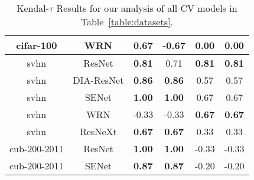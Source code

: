 \begin{table}[t]
\begin{center}
\begin{tabular}{|c|c|c|c|c|c|}
cifar-100 & WRN  & \textbf{0.67} & -0.67 & 0.00 & 0.00 \\
\hline
svhn & ResNet  & \textbf{0.81} & 0.71 & \textbf{0.81} & \textbf{0.81} \\
svhn & DIA-ResNet  & \textbf{0.86} & \textbf{0.86} & 0.57 & 0.57 \\
svhn & SENet  & \textbf{1.00} & \textbf{1.00} & 0.67 & 0.67 \\
svhn & WRN  & -0.33 & -0.33 & \textbf{0.67} & \textbf{0.67} \\
svhn & ResNeXt  & \textbf{0.67} & \textbf{0.67} & 0.33 & 0.33 \\
\hline
cub-200-2011 & ResNet  & \textbf{1.00} & \textbf{1.00} & -0.33 & -0.33 \\
cub-200-2011 & SENet  & \textbf{0.87} & \textbf{0.87} & -0.20 & -0.20 \\

\hline
\end{tabular}
\vspace{-5mm}
\end{center}
\caption{Kendal-$\tau$ Results for our analysis of all CV models in Table~\ref{table:datasets}. }
\label{table:Ktauresults}
\end{table}

